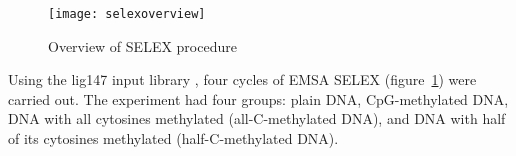 \documentclass[parskip=full, numbers=noenddot]{scrreprt}
\begin{document}
\begin{figure}[htpb]
  \centering
  \texttt{[image: selexoverview]}
  \caption{Overview of SELEX procedure}
  \label{fig:selex}
\end{figure}

Using the lig147 input library \citep{zhu_interaction_2018}, four cycles of EMSA SELEX (figure~\ref{fig:selex}) were carried out.  The experiment had four groups: plain DNA, CpG-methylated DNA, DNA with all cytosines methylated (all-C-methylated DNA), and DNA with half of its cytosines methylated (half-C-methylated DNA).




\end{document}

